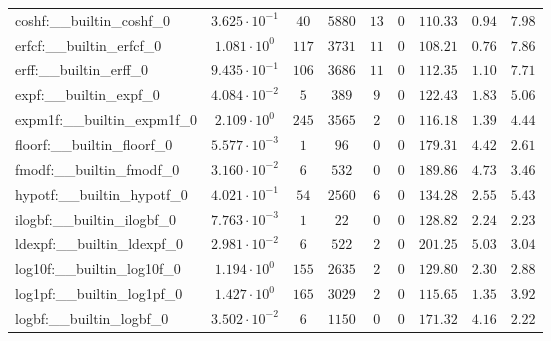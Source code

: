 \begin{tabular}{|l|c|c|c|c|c|c|c|c|}
coshf:\_\_builtin\_coshf\_0               & $ 3.625 \cdot 10^{-1} $ & $ 40     $ & $ 5880   $ & $ 13  $ & $ 0   $ & $ 110.33      $ & $ 0.94    $ & $ 7.98    $ \\
erfcf:\_\_builtin\_erfcf\_0               & $ 1.081 \cdot 10^{0}  $ & $ 117    $ & $ 3731   $ & $ 11  $ & $ 0   $ & $ 108.21      $ & $ 0.76    $ & $ 7.86    $ \\
erff:\_\_builtin\_erff\_0                 & $ 9.435 \cdot 10^{-1} $ & $ 106    $ & $ 3686   $ & $ 11  $ & $ 0   $ & $ 112.35      $ & $ 1.10    $ & $ 7.71    $ \\
expf:\_\_builtin\_expf\_0                 & $ 4.084 \cdot 10^{-2} $ & $ 5      $ & $ 389    $ & $ 9   $ & $ 0   $ & $ 122.43      $ & $ 1.83    $ & $ 5.06    $ \\
expm1f:\_\_builtin\_expm1f\_0             & $ 2.109 \cdot 10^{0}  $ & $ 245    $ & $ 3565   $ & $ 2   $ & $ 0   $ & $ 116.18      $ & $ 1.39    $ & $ 4.44    $ \\
floorf:\_\_builtin\_floorf\_0             & $ 5.577 \cdot 10^{-3} $ & $ 1      $ & $ 96     $ & $ 0   $ & $ 0   $ & $ 179.31      $ & $ 4.42    $ & $ 2.61    $ \\
fmodf:\_\_builtin\_fmodf\_0               & $ 3.160 \cdot 10^{-2} $ & $ 6      $ & $ 532    $ & $ 0   $ & $ 0   $ & $ 189.86      $ & $ 4.73    $ & $ 3.46    $ \\
hypotf:\_\_builtin\_hypotf\_0             & $ 4.021 \cdot 10^{-1} $ & $ 54     $ & $ 2560   $ & $ 6   $ & $ 0   $ & $ 134.28      $ & $ 2.55    $ & $ 5.43    $ \\
ilogbf:\_\_builtin\_ilogbf\_0             & $ 7.763 \cdot 10^{-3} $ & $ 1      $ & $ 22     $ & $ 0   $ & $ 0   $ & $ 128.82      $ & $ 2.24    $ & $ 2.23    $ \\
ldexpf:\_\_builtin\_ldexpf\_0             & $ 2.981 \cdot 10^{-2} $ & $ 6      $ & $ 522    $ & $ 2   $ & $ 0   $ & $ 201.25      $ & $ 5.03    $ & $ 3.04    $ \\
log10f:\_\_builtin\_log10f\_0             & $ 1.194 \cdot 10^{0}  $ & $ 155    $ & $ 2635   $ & $ 2   $ & $ 0   $ & $ 129.80      $ & $ 2.30    $ & $ 2.88    $ \\
log1pf:\_\_builtin\_log1pf\_0             & $ 1.427 \cdot 10^{0}  $ & $ 165    $ & $ 3029   $ & $ 2   $ & $ 0   $ & $ 115.65      $ & $ 1.35    $ & $ 3.92    $ \\
logbf:\_\_builtin\_logbf\_0               & $ 3.502 \cdot 10^{-2} $ & $ 6      $ & $ 1150   $ & $ 0   $ & $ 0   $ & $ 171.32      $ & $ 4.16    $ & $ 2.22    $ \\

\end{tabular}
